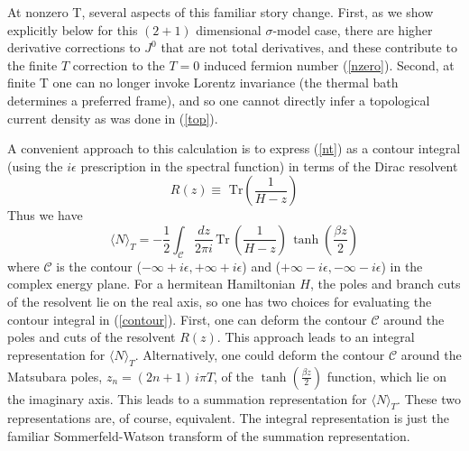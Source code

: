 \documentclass[a4paper,prd]{revtex4}
\begin{document}
At nonzero T, several aspects of this familiar story change. First, as
we show explicitly below for this $(2+1)$ dimensional $\sigma$-model
case, there are higher derivative corrections to $J^0$ that are not
total derivatives, and these contribute to the finite $T$ correction
to the $T=0$ induced fermion number (\ref{nzero}). Second, at finite T
one can no longer invoke Lorentz invariance (the thermal bath
determines a preferred frame), and so one cannot directly infer a
topological current density as was done in (\ref{top}). 

A convenient approach to this calculation is to express (\ref{nt}) as a
contour integral (using the $ i\epsilon$ prescription in the spectral
function) in terms of the Dirac resolvent
\begin{equation}
R(z)\equiv \textrm{ Tr}(\frac{1}{H-z})
\label{resolvent}
\end{equation}
Thus we have
\begin{equation}
\langle N\rangle _T =-\frac{1}{2}\int_\mathcal{C}\frac{dz}{2\pi i}\,
\textrm{Tr}\, (\frac{1}{H-z}) \,\tanh(\frac{\beta z}{2})
\label{contour}
\end{equation}
where $\mathcal{C}$ is the contour ($-\infty +i\epsilon ,+\infty +i\epsilon$) and 
($+\infty -i\epsilon ,-\infty -i\epsilon$) in the complex energy plane. For a
hermitean Hamiltonian $H$, the poles and branch cuts of the resolvent lie on the
real axis, so one has two choices for evaluating the contour integral in
(\ref{contour}). First, one can deform the contour $\mathcal{C}$ around the poles and
cuts of the resolvent $R(z)$. This approach leads to an integral representation for
$\langle N\rangle_{T}$. Alternatively, one could deform the contour $\mathcal{C}$
around the Matsubara poles, $z_n=(2 n+1)\,i\pi  T$, of the $\tanh(\frac{\beta
z}{2})$ function, which lie on the imaginary axis. This leads to a summation
representation for $\langle N\rangle _T$. These two representations are, of course,
equivalent. The integral representation is just the familiar Sommerfeld-Watson
transform of the summation representation.  
\end{document}
